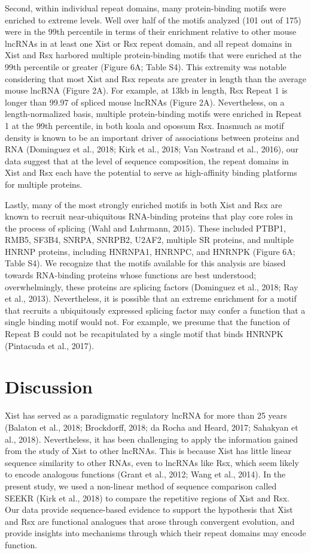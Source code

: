 Second, within individual repeat domains, many protein-binding motifs were enriched to extreme levels. Well over half of the motifs analyzed (101 out of 175) were in the 99th percentile in terms of their enrichment relative to other mouse lncRNAs in at least one Xist or Rsx repeat domain, and all repeat domains in Xist and Rsx harbored multiple protein-binding motifs that were enriched at the 99th percentile or greater (Figure 6A; Table S4). This extremity was notable considering that most Xist and Rsx repeats are greater in length than the average mouse lncRNA (Figure 2A). For example, at 13kb in length, Rsx Repeat 1 is longer than 99.97 of spliced mouse lncRNAs (Figure 2A). Nevertheless, on a length-normalized basis, multiple protein-binding motifs were enriched in Repeat 1 at the 99th percentile, in both koala and opossum Rsx. Inasmuch as motif density is known to be an important driver of associations between proteins and RNA (Dominguez et al., 2018; Kirk et al., 2018; Van Nostrand et al., 2016), our data suggest that at the level of sequence composition, the repeat domains in Xist and Rsx each have the potential to serve as high-affinity binding platforms for multiple proteins.

Lastly, many of the most strongly enriched motifs in both Xist and Rsx are known to recruit near-ubiquitous RNA-binding proteins that play core roles in the process of splicing (Wahl and Luhrmann, 2015). These included PTBP1, RMB5, SF3B4, SNRPA, SNRPB2, U2AF2, multiple SR proteins, and multiple HNRNP proteins, including HNRNPA1, HNRNPC, and HNRNPK (Figure 6A; Table S4). We recognize that the motifs available for this analysis are biased towards RNA-binding proteins whose functions are best understood; overwhelmingly, these proteins are splicing factors (Dominguez et al., 2018; Ray et al., 2013). Nevertheless, it is possible that an extreme enrichment for a motif that recruits a ubiquitously expressed splicing factor may confer a function that a single binding motif would not. For example, we presume that the function of Repeat B could not be recapitulated by a single motif that binds HNRNPK (Pintacuda et al., 2017). 


\section{Discussion}
Xist has served as a paradigmatic regulatory lncRNA for more than 25 years (Balaton et al., 2018; Brockdorff, 2018; da Rocha and Heard, 2017; Sahakyan et al., 2018). Nevertheless, it has been challenging to apply the information gained from the study of Xist to other lncRNAs. This is because Xist has little linear sequence similarity to other RNAs, even to lncRNAs like Rsx, which seem likely to encode analogous functions (Grant et al., 2012; Wang et al., 2014). In the present study, we used a non-linear method of sequence comparison called SEEKR (Kirk et al., 2018) to compare the repetitive regions of Xist and Rsx. Our data provide sequence-based evidence to support the hypothesis that Xist and Rsx are functional analogues that arose through convergent evolution, and provide insights into mechanisms through which their repeat domains may encode function. 

